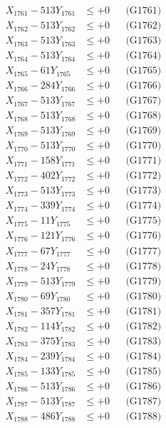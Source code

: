 \documentclass[a4paper,10pt]{article}
\begin{document}
{\begin{align}
\allowbreak
X_{1761} - 513Y_{1761} &\leq +0 && \text{(G1761)} \\
X_{1762} - 513Y_{1762} &\leq +0 && \text{(G1762)} \\
X_{1763} - 513Y_{1763} &\leq +0 && \text{(G1763)} \\
X_{1764} - 513Y_{1764} &\leq +0 && \text{(G1764)} \\
X_{1765} - 61Y_{1765} &\leq +0 && \text{(G1765)} \\
X_{1766} - 284Y_{1766} &\leq +0 && \text{(G1766)} \\
X_{1767} - 513Y_{1767} &\leq +0 && \text{(G1767)} \\
X_{1768} - 513Y_{1768} &\leq +0 && \text{(G1768)} \\
X_{1769} - 513Y_{1769} &\leq +0 && \text{(G1769)} \\
X_{1770} - 513Y_{1770} &\leq +0 && \text{(G1770)} \\
\allowbreak
X_{1771} - 158Y_{1771} &\leq +0 && \text{(G1771)} \\
X_{1772} - 402Y_{1772} &\leq +0 && \text{(G1772)} \\
X_{1773} - 513Y_{1773} &\leq +0 && \text{(G1773)} \\
X_{1774} - 339Y_{1774} &\leq +0 && \text{(G1774)} \\
X_{1775} - 11Y_{1775} &\leq +0 && \text{(G1775)} \\
X_{1776} - 121Y_{1776} &\leq +0 && \text{(G1776)} \\
X_{1777} - 67Y_{1777} &\leq +0 && \text{(G1777)} \\
X_{1778} - 24Y_{1778} &\leq +0 && \text{(G1778)} \\
X_{1779} - 513Y_{1779} &\leq +0 && \text{(G1779)} \\
X_{1780} - 69Y_{1780} &\leq +0 && \text{(G1780)} \\
\allowbreak
X_{1781} - 357Y_{1781} &\leq +0 && \text{(G1781)} \\
X_{1782} - 114Y_{1782} &\leq +0 && \text{(G1782)} \\
X_{1783} - 375Y_{1783} &\leq +0 && \text{(G1783)} \\
X_{1784} - 239Y_{1784} &\leq +0 && \text{(G1784)} \\
X_{1785} - 133Y_{1785} &\leq +0 && \text{(G1785)} \\
X_{1786} - 513Y_{1786} &\leq +0 && \text{(G1786)} \\
X_{1787} - 513Y_{1787} &\leq +0 && \text{(G1787)} \\
X_{1788} - 486Y_{1788} &\leq +0 && \text{(G1788)} \\

\end{align}}
\end{document}

